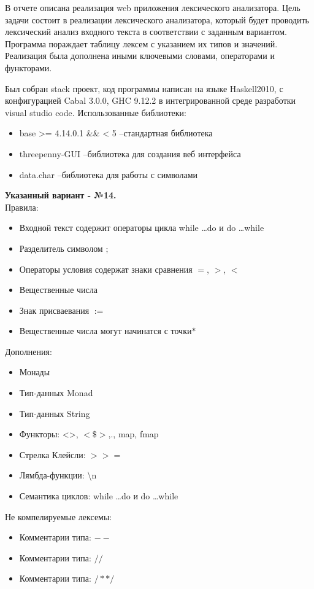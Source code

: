\documentclass[areasetadvanced]{scrartcl}
\begin{document}
    В отчете описана реализация web приложения лексического анализатора.
    Цель задачи состоит в реализации лексического анализатора, который будет проводить лексический анализ входного текста в соответствии с заданным вариантом. Программа пораждает таблицу лексем с указанием их типов и значений.
    Реализация была дополнена иными ключевыми словами, операторами и функторами. 
\begin{sloppypar}
    Был собран stack проект, код программы написан на языке Haskell2010, с конфигурацией Cabal 3.0.0, GHC 9.12.2 в интегрированной среде разработки visual studio code.
    Использованные библиотеки: 
\end{sloppypar}
\begin{itemize}
    \item base >= 4.14.0.1 \&\& < 5 --стандартная библиотека
    \item threepenny-GUI --библиотека для создания веб интерфейса
    \item data.char --библиотека для работы с символами
\end{itemize}
    \textbf{Указанный вариант - №14.} \\
    Правила:
    \begin{itemize}
        \item Входной текст содержит операторы цикла while \dots do и do \dots while
        \item Разделитель символом $;$
        \item Операторы условия содержат знаки сравнения $=$, $>$, $<$
        \item Вещественные числа
        \item Знак присваевания $:=$
        \item Вещественные числа могут начинатся с точки$*$
    \end{itemize}
    Дополнения:
    \begin{itemize}
        \item Монады
        \item Тип-данных Monad
        \item Тип-данных String
        \item Функторы: <>, $<\$>$,$.$, map, fmap
        \item Стрелка Клейсли: $>>=$
        \item Лямбда-функции: \textbackslash n
        \item Семантика циклов: while \dots do и do \dots while
    \end{itemize}
    Не компелируемые лексемы:
    \begin{itemize}
        \item Комментарии типа: $--$
        \item Комментарии типа: $//$
        \item Комментарии типа: $/* */$
    \end{itemize}
\end{document}
